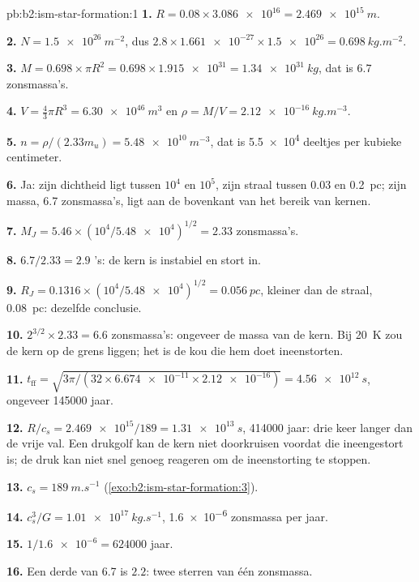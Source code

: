 \begin{solution}{pb:b2:ism-star-formation:1}
\textbf{1.} $R = 0.08\times\num{3.086e16} = \qty{2.469e15}{m}$.

\textbf{2.} $N = \qty{1.5e26}{m^{-2}}$, dus $2.8\times\num{1.661e-27}\times\num{1.5e26} =
\qty{0.698}{kg.m^{-2}}$.

\textbf{3.} $M = 0.698\times\pi R^2 = 0.698\times\num{1.915e31} = \qty{1.34e31}{kg}$,
dat is $6.7$ zonsmassa's.

\textbf{4.} $V = \tfrac43\pi R^3 = \qty{6.30e46}{m^3}$ en
$\rho = M/V = \qty{2.12e-16}{kg.m^{-3}}$.

\textbf{5.} $n = \rho/(2.33m_u) = \qty{5.48e10}{m^{-3}}$, dat is \num{5.5e4} deeltjes
per kubieke centimeter.

\textbf{6.} Ja: zijn dichtheid ligt tussen $10^4$ en $10^5$, zijn straal tussen 0.03 en
\qty{0.2}{pc}; zijn massa, 6.7 zonsmassa's, ligt aan de bovenkant van het bereik van kernen.

\textbf{7.} $M_J = 5.46\times(10^4/\num{5.48e4})^{1/2} = 2.33$ zonsmassa's.

\textbf{8.} $6.7/2.33 = 2.9$ 's: de kern is instabiel en stort in.

\textbf{9.} $R_J = 0.1316\times(10^4/\num{5.48e4})^{1/2} = \qty{0.056}{pc}$, kleiner dan
de straal, \qty{0.08}{pc}: dezelfde conclusie.

\textbf{10.} $2^{3/2}\times2.33 = 6.6$ zonsmassa's: ongeveer de massa van de kern. Bij
\qty{20}{K} zou de kern op de grens liggen; het is de kou die hem doet ineenstorten.

\textbf{11.} $t_{\mathrm{ff}} = \sqrt{3\pi/(32\times\num{6.674e-11}\times\num{2.12e-16})}
= \qty{4.56e12}{s}$, ongeveer \num{145000} jaar.

\textbf{12.} $R/c_s = \num{2.469e15}/189 = \qty{1.31e13}{s}$, \num{414000} jaar: drie
keer langer dan de vrije val. Een drukgolf kan de kern niet doorkruisen voordat die
ineengestort is; de druk kan niet snel genoeg reageren om de ineenstorting te stoppen.

\textbf{13.} $c_s = \qty{189}{m.s^{-1}}$ (\cref{exo:b2:ism-star-formation:3}).

\textbf{14.} $c_s^3/G = \qty{1.01e17}{kg.s^{-1}}$, \num{1.6e-6} zonsmassa per jaar.

\textbf{15.} $1/\num{1.6e-6} = \num{624000}$ jaar.

\textbf{16.} Een derde van 6.7 is $2.2$: twee sterren van één zonsmassa.


\end{solution}
